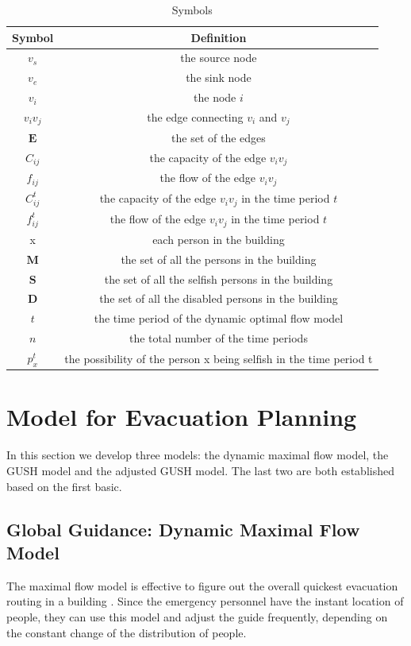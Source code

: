\documentclass[a4paper,12pt]{article}
\begin{document}
\begin{table}[h]
  \caption{Symbols}
  \label{tab1}
  \centering
  \begin{tabular}{cc}
  \toprule
   \textbf{Symbol} & \textbf{Definition}\\
  \midrule
 $v_s$ & the source node \\ 
 $v_e$ & the sink node \\
 $v_i$ & the node $i$\\
 $v_iv_j$ & the edge connecting $v_i$ and $v_j$\\
 $\bm{E}$ & the set of the edges\\
 $C_{ij}$ & the capacity of the edge $v_iv_j$\\
 $f_{ij}$ & the flow of the edge $v_iv_j$\\
 $C^t_{ij}$ & the capacity of the edge $v_iv_j$ in the time period $t$\\ 
 $f^t_{ij}$ & the flow of the edge $v_iv_j$ in the time period $t$\\
 x & each person in the building\\
 $\bm{M}$ & the set of all the persons in the building\\
 $\bm{S}$ & the set of all the selfish persons in the building\\
 $\bm{D}$ & the set of all the disabled persons in the building\\
 $t$ & the time period of the dynamic optimal flow model \\
 $n$& the total number of the time periods\\
 $p^t_x$ & the possibility of the person x being selfish in the time period t\\
  \bottomrule
  \end{tabular}
\end{table}

\section{Model for Evacuation Planning}
In this section we develop three models: the dynamic maximal flow model, the GUSH model and the adjusted GUSH model. The last two are both established based on the first basic.
\subsection{Global Guidance: Dynamic Maximal Flow Model} 
The maximal flow model is effective to figure out the overall quickest evacuation routing in a building \citep{lim2012capacitated}. Since the emergency personnel have the instant location of people, they can use this model and adjust the guide frequently, depending on the constant change of the distribution of people.
\end{document}
